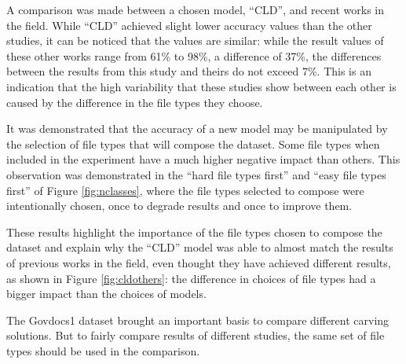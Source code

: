 A comparison was made between a chosen model, ``CLD'', and recent works in the field. While ``CLD'' achieved slight lower accuracy values than the other studies, it can be noticed that the values are similar:
while the result values of these other works range from 61\% to 98\%, a difference of 37\%, the differences between the results from this study and theirs do not exceed 7\%. This is an indication that the high  variability that these studies show between each other is caused by the difference in the file types they choose.

It was demonstrated that the accuracy of a new model may be manipulated by the selection of file types that will compose the dataset. 
Some file types when included in the experiment have a much higher negative impact than others. This observation was demonstrated in the ``hard file types first'' and ``easy file types first'' of Figure \ref{fig:nclasses}, where the file types selected to compose were intentionally chosen, once to degrade results and once to improve them.

These results highlight the importance of the file types chosen to compose the dataset and explain why the ``CLD'' model was able to almost match the results of previous works in the field, even thought they have achieved different results, as shown in Figure \ref{fig:cldothers}: the difference in choices of file types had a bigger impact than the choices of models.

The Govdocs1 dataset brought an important basis to compare different carving solutions. But to fairly compare results of different studies, the same set of file types should be used in the comparison.
